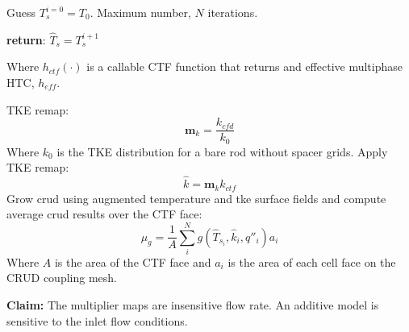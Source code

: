 \begin{itemize}
    \begin{algorithm}[H]
    Guess $T^{i=0}_s=T_0$.  Maximum number, $N$ iterations.

        \textbf{return}: $\hat T_s = T^{i+1}_s$
        \end{algorithm}
    Where $h_{ctf}(\cdot)$ is a callable CTF function that returns and effective multiphase HTC, $h_{eff}$.

    TKE remap:
    \begin{equation}
       \mathbf m_{k} = \frac{k_{cfd}}{k_{0}}
    \end{equation}
    Where $k_0$ is the TKE distribution for a bare rod without spacer grids.
    Apply TKE remap:
       \begin{equation}
       \hat k = \mathbf m_k k_{ctf}
       \end{equation}
     Grow crud using augmented temperature and tke surface fields and compute average crud results over the CTF face:
     \begin{equation}
     \mu_g = \frac{1}{A} \sum_i^N g(\hat T_{s_i}, \hat k_i, q''_i) a_i
     \end{equation}
    Where $A$ is the area of the CTF face and $a_i$ is the area of each cell face on the CRUD coupling mesh.

    \textbf{Claim:} The multiplier maps are insensitive flow rate.  An additive model is sensitive to the inlet flow conditions.


\end{itemize}
